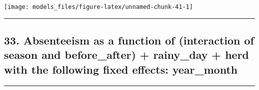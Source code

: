 \documentclass[]{article}
\begin{document}
\begin{center}\texttt{[image: models\_files/figure-latex/unnamed-chunk-41-1]} \end{center}

\newpage

\begin{center}\rule{0.5\linewidth}{\linethickness}\end{center}

\subsection{33. Absenteeism as a function of (interaction of season and
before\_after) + rainy\_day + herd with the following fixed effects:
year\_month}\label{absenteeism-as-a-function-of-interaction-of-season-and-before_after-rainy_day-herd-with-the-following-fixed-effects-year_month}

\begin{center}\rule{0.5\linewidth}{\linethickness}\end{center}
\end{document}
